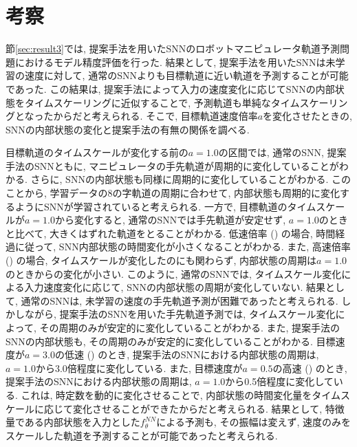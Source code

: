 \section{考察}

節\ref{sec:result3}では, 提案手法を用いたSNNのロボットマニピュレータ軌道予測問題におけるモデル精度評価を行った.
結果として, 提案手法を用いたSNNは未学習の速度に対して, 通常のSNNよりも目標軌道に近い軌道を予測することが可能であった.
この結果は, 提案手法によって入力の速度変化に応じてSNNの内部状態をタイムスケーリングに近似することで, 予測軌道も単純なタイムスケーリングとなったからだと考えられる.
そこで, 目標軌道速度倍率$a$を変化させたときの, SNNの内部状態の変化と提案手法の有無の関係を調べる.

目標軌道のタイムスケールが変化する前の$a=1.0$の区間では, 通常のSNN, 提案手法のSNNともに, マニピュレータの手先軌道が周期的に変化していることがわかる.
さらに, SNNの内部状態も同様に周期的に変化していることがわかる.
このことから, 学習データの8の字軌道の周期に合わせて, 内部状態も周期的に変化するようにSNNが学習されていると考えられる.
一方で, 目標軌道のタイムスケールが$a=1.0$から変化すると, 通常のSNNでは手先軌道が安定せず, $a=1.0$のときと比べて, 大きくはずれた軌道をとることがわかる.
低速倍率 () の場合, 時間経過に従って, SNN内部状態の時間変化が小さくなることがわかる.
また, 高速倍率 () の場合, タイムスケールが変化したのにも関わらず, 内部状態の周期は$a=1.0$のときからの変化が小さい.
このように, 通常のSNNでは, タイムスケール変化による入力速度変化に応じて, SNNの内部状態の周期が変化していない.
結果として, 通常のSNNは, 未学習の速度の手先軌道予測が困難であったと考えられる.
しかしながら, 提案手法のSNNを用いた手先軌道予測では, タイムスケール変化によって, その周期のみが安定的に変化していることがわかる.
また, 提案手法のSNNの内部状態も, その周期のみが安定的に変化していることがわかる.
目標速度が$a=3.0$の低速 () のとき, 提案手法のSNNにおける内部状態の周期は, $a=1.0$から3.0倍程度に変化している.
また, 目標速度が$a=0.5$の高速 () のとき, 提案手法のSNNにおける内部状態の周期は, $a=1.0$から0.5倍程度に変化している.
これは, 時定数を動的に変化させることで, 内部状態の時間変化量をタイムスケールに応じて変化させることができたからだと考えられる.
結果として, 特徴量である内部状態を入力とした$f^{NN}_\theta$による予測も, その振幅は変えず, 速度のみをスケールした軌道を予測することが可能であったと考えられる.

